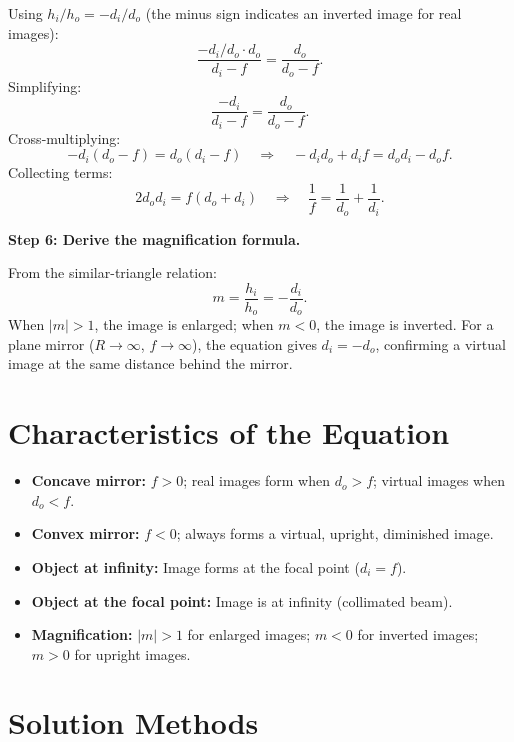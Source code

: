 Using $h_i/h_o = -d_i/d_o$ (the minus sign indicates an inverted image for real images):
\begin{equation}
\frac{-d_i/d_o \cdot d_o}{d_i - f} = \frac{d_o}{d_o - f}.
\end{equation}
Simplifying:
\begin{equation}
\frac{-d_i}{d_i - f} = \frac{d_o}{d_o - f}.
\end{equation}
Cross-multiplying:
\begin{equation}
-d_i(d_o - f) = d_o(d_i - f) \quad\Longrightarrow\quad -d_i d_o + d_i f = d_o d_i - d_o f.
\end{equation}
Collecting terms:
\begin{equation}
2d_o d_i = f(d_o + d_i) \quad\Longrightarrow\quad \boxed{\frac{1}{f} = \frac{1}{d_o} + \frac{1}{d_i}}.
\end{equation}

\textbf{Step 6: Derive the magnification formula.}

From the similar-triangle relation:
\begin{equation}
m = \frac{h_i}{h_o} = -\frac{d_i}{d_o}.
\end{equation}
When $|m| > 1$, the image is enlarged; when $m < 0$, the image is inverted. For a plane mirror ($R \to \infty$, $f \to \infty$), the equation gives $d_i = -d_o$, confirming a virtual image at the same distance behind the mirror.

\section*{Characteristics of the Equation}

\begin{itemize}
  \item \textbf{Concave mirror:} $f > 0$; real images form when $d_{o} > f$; virtual images when $d_{o} < f$.
  \item \textbf{Convex mirror:} $f < 0$; always forms a virtual, upright, diminished image.
  \item \textbf{Object at infinity:} Image forms at the focal point ($d_{i} = f$).
  \item \textbf{Object at the focal point:} Image is at infinity (collimated beam).
  \item \textbf{Magnification:} $|m| > 1$ for enlarged images; $m < 0$ for inverted images; $m > 0$ for upright images.
\end{itemize}
\section*{Solution Methods}

